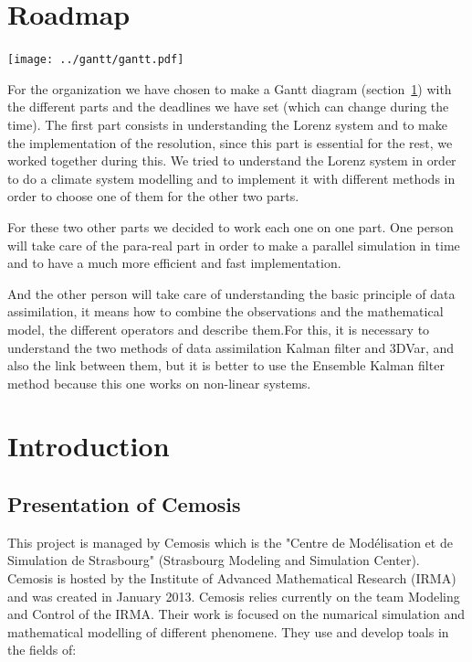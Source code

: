 \documentclass[12pt]{article}
\begin{document}
	\nocite{*}
	
	
	
	\tableofcontents
	
    \newpage
	\section{Roadmap}
	    \label{diag}
	    
	\begin{center}
		\texttt{[image: ../gantt/gantt.pdf]}
	\end{center}
	
	\noindent For the organization we have chosen to make a Gantt diagram (section~\ref{diag}) with the different parts and the deadlines we have set (which can change during the time). The first part consists in understanding the Lorenz system and to make the implementation of the resolution, since this part is essential for the rest, we worked together during this.
	We tried to understand the Lorenz system in order to do a climate system modelling and to implement it with different methods in order to choose one of them for the other two parts. 
	
	
	\noindent For these two other parts we decided to work each one on one part. One person will take care of the para-real part in order to make a parallel simulation in time and to have a much more efficient and fast implementation.
	
	
    \noindent And the other person will take care of understanding the basic principle of data assimilation, it means how to combine the observations and the mathematical model, the different operators and describe them.For this, it is necessary to understand the two methods of data assimilation Kalman filter and 3DVar, and also the link between them, but it is better to use the Ensemble Kalman filter method because this one works on non-linear systems.


	\section{Introduction}
	
	\subsection{Presentation of Cemosis}
	
	This project is managed by Cemosis which is the "Centre de Modélisation et de Simulation de Strasbourg" (Strasbourg Modeling and Simulation Center). Cemosis is hosted by the Institute of Advanced Mathematical Research (IRMA) and was created in January 2013. Cemosis relies currently on the team Modeling and Control of the IRMA. Their work is focused on the numarical simulation and mathematical modelling of different phenomene. They use and develop toals in the fields of:
	
\end{document}

